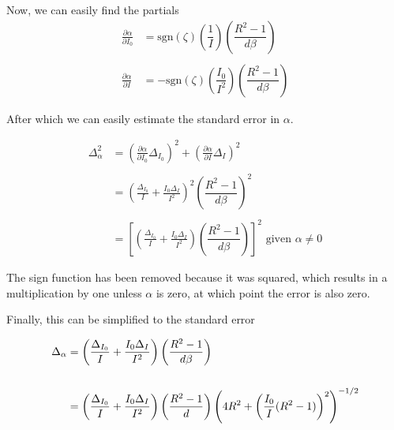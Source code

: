     Now, we can easily find the partials
    \begin{align*}
      \frac{\partial \alpha}{\partial I_0} &= \text{sgn}(\zeta)\left(\dfrac{1}{I}\right)\left(\dfrac{R^2-1}{d\beta}\right)\\\\
        \frac{\partial \alpha}{\partial I} &= -\text{sgn}(\zeta)\left(\dfrac{I_0}{I^2}\right)\left(\dfrac{R^2-1}{d\beta}\right)
    \end{align*}

    After which we can easily estimate the standard error in $\alpha$.

    \begin{align*}
      \Delta_\alpha^2 &= \left(\frac{\partial \alpha}{\partial I_0} \Delta_{I_0}\right)^2  + \left(\frac{\partial \alpha}{\partial I} \Delta_{I}\right)^2 \\\\
                      &= \left(\frac{\Delta_{I_0}}{I} + \frac{I_0\Delta_{I}}{I^2}\right)^2 \left(\dfrac{R^2-1}{d\beta}\right)^2 \\\\
                      &= \left[\left(\frac{\Delta_{I_0}}{I} + \frac{I_0\Delta_{I}}{I^2}\right)\left(\dfrac{R^2-1}{d\beta}\right)\right]^2 \text{ given $\alpha \neq 0$}
    \end{align*}

    The sign function has been removed because it was squared, which results in a multiplication by one unless $\alpha$ is zero, at which point the error is also zero.

    Finally, this can be simplified to the standard error

    \begin{align}
      \Delta_\alpha &= \left(\frac{\Delta_{I_0}}{I} + \frac{I_0\Delta_{I}}{I^2}\right) \left(\dfrac{R^2-1}{d\beta}\right) \notag\\\notag\\
                    &= \left(\frac{\Delta_{I_0}}{I} + \frac{I_0\Delta_{I}}{I^2}\right) \left(\dfrac{R^2-1}{d}\right)\left(4R^2+\left(\frac{I_0}{I}(R^2-1)\right)^2\right)^{-1/2} \label{eq:err_full}
    \end{align}
    {}



